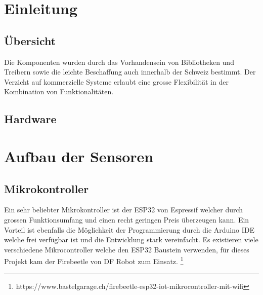 \documentclass[
  12pt, %
  a4paper, %
  twoside, %
  openright, %
  numbers=noenddot, %
  BCOR=5mm, %
  parskip=half*, %
  thesis, %
]{bfhbook}
\begin{document}
\chapter{Einleitung}
\section{Übersicht}
Die Komponenten wurden durch das Vorhandensein von Bibliotheken und Treibern sowie die leichte Beschaffung auch innerhalb der Schweiz bestimmt. Der Verzicht auf kommerzielle Systeme erlaubt eine grosse Flexibilität in der Kombination von Funktionalitäten.
\section{Hardware}

\chapter{Aufbau der Sensoren}
\section{Mikrokontroller}
Ein sehr beliebter Mikrokontroller ist der ESP32 von Espressif \cite{espressif} welcher durch grossen Funktionsumfang und einen recht geringen Preis überzeugen kann. Ein Vorteil ist ebenfalls die Möglichkeit der Programmierung durch die Arduino\cite{arduino} IDE welche frei verfügbar ist und die Entwicklung stark vereinfacht. Es existieren viele verschiedene Mikrocontroller welche den ESP32 Baustein verwenden, für dieses Projekt kam der Firebeetle \cite{firebeetle} von DF Robot zum Einsatz.  \footnote{https://www.bastelgarage.ch/firebeetle-esp32-iot-mikrocontroller-mit-wifi}
\end{document}
